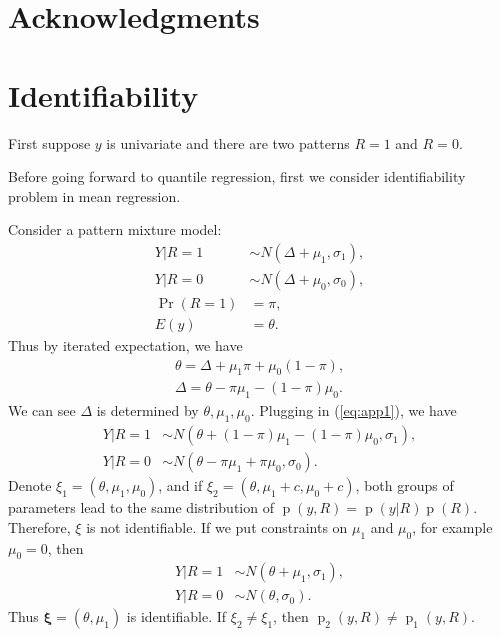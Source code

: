 \documentclass[12pt]{article}
\DeclareMathOperator{\pr}{p}
\DeclareMathOperator{\prob}{Pr}
\begin{document}
\section{Acknowledgments}




\appendix
\section{Identifiability}
\label{sec:iden}
First suppose $y$ is univariate and there are two patterns $R = 1$ and
$R = 0$.

Before going forward to quantile regression, first we consider
identifiability problem in mean regression.

Consider a pattern mixture model:
\begin{align}
  Y | R = 1 & \sim N(\Delta + \mu_1, \sigma_1), \label{eq:app1} \\
  Y | R = 0 & \sim N(\Delta + \mu_0, \sigma_0), \nonumber\\
  \prob (R = 1) & = \pi, \nonumber\\
  E (y ) & = \theta. \nonumber
\end{align}
Thus by iterated expectation, we have
\begin{align*}
  \theta = \Delta + \mu_1\pi + \mu_0(1-\pi), \\
  \Delta = \theta - \pi \mu_1 - (1 - \pi)\mu_0.
\end{align*}
We can see $\Delta$ is determined by $\theta, \mu_1, \mu_0$. Plugging
in (\ref{eq:app1}), we have
\begin{align*}
  Y| R = 1 & \sim N(\theta + (1 - \pi)\mu_1 - (1 - \pi)\mu_0, \sigma_1), \\
  Y| R = 0 & \sim N(\theta - \pi \mu_1 + \pi \mu_0, \sigma_0).
\end{align*}
Denote $\xi_1 = (\theta, \mu_1, \mu_0)$, and if $\xi_2 = (\theta,
\mu_1+ c, \mu_0+c)$, both groups of parameters lead to the same
distribution of $\pr(y, R) = \pr(y|R)\pr(R)$. Therefore, $\xi$ is not
identifiable.  If we put constraints on $\mu_1$ and $\mu_0$, for
example $\mu_0 = 0$, then
\begin{align*}
  Y | R = 1 & \sim N(\theta + \mu_1, \sigma_1), \\
  Y | R = 0 & \sim N(\theta, \sigma_0).
\end{align*}
Thus $\bm \xi = (\theta, \mu_1)$ is identifiable. If $\xi_2 \neq
\xi_1$, then $\pr_2(y, R) \neq \pr_1(y, R)$.
\end{document}
